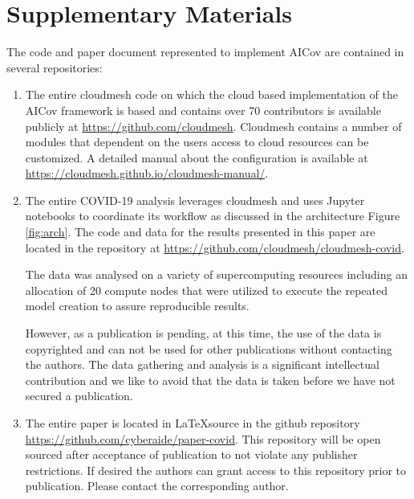 \documentclass[a4paper, inpress]{jds} %
\renewcommand{\_}{%
    \textunderscore\hspace{0pt}%
}
\begin{document}
%
%

\section*{Supplementary Materials}

The code and paper document represented to implement AICov are contained in several repositories:

\begin{enumerate}
    \item The entire cloudmesh code on which the cloud based implementation of the AICov framework is based and contains over 70 contributors is available publicly at \url{https://github.com/cloudmesh}. Cloudmesh contains a number of modules that dependent on the users access to cloud resources can be customized. A detailed manual about the configuration is available at \url{https://cloudmesh.github.io/cloudmesh-manual/}.
    
    \item The entire COVID-19 analysis leverages cloudmesh and uses Jupyter notebooks to coordinate its workflow as discussed in the architecture Figure \ref{fig:arch}. The code and data for the results presented in this paper are located in the repository at \url{https://github.com/cloudmesh/cloudmesh-covid}.
    
    The data was analysed on a variety of supercomputing resources including an allocation of 20 compute nodes that were utilized to execute the  repeated model creation to assure reproducible results.
    
    However, as a publication is pending, at this time, the use of the data is copyrighted and can not be used for other publications without contacting the authors. The data gathering and analysis is a significant intellectual contribution and we like to avoid that the data is taken before we have not secured a publication. 
    
    \item The entire paper is located in \LaTeX source in the github repository \url{https://github.com/cyberaide/paper-covid}. This repository will be open sourced after acceptance of publication to not violate any publisher restrictions. If desired the authors can grant access to this repository prior to publication. Please contact the corresponding author.
    
\end{enumerate}

%
%
\end{document}
